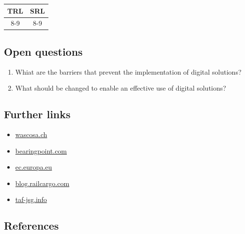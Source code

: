 \documentclass[
]{book}
\providecommand{\tightlist}{%
  \setlength{\itemsep}{0pt}\setlength{\parskip}{0pt}}
\begin{document}
\begin{longtable}[]{@{}cc@{}}
\toprule
TRL & SRL\tabularnewline
\midrule
\endhead
8-9 & 8-9\tabularnewline
\bottomrule
\end{longtable}

\hypertarget{open-questions-26}{%
\subsection*{Open questions}\label{open-questions-26}}

\begin{enumerate}
\def\labelenumi{\arabic{enumi}.}
\tightlist
\item
  Whiat are the barriers that prevent the implementation of digital solutions?
\item
  What should be changed to enable an effective use of digital solutions?
\end{enumerate}

\hypertarget{further-links-23}{%
\subsection*{Further links}\label{further-links-23}}

\begin{itemize}
\tightlist
\item
  \href{https://www.wascosa.ch/infoletter/2016/wascosa-infoletter-25-en.pdf}{wascosa.ch}
\item
  \href{https://www.bearingpoint.com/files/Digitalization_rail_infrastructure_management_PR.pdf?download=0\&itemId=659400}{bearingpoint.com}
\item
  \href{https://ec.europa.eu/transport/modes/rail/useful-links_de}{ec.europa.eu}
\item
  \href{https://blog.railcargo.com/en/artikel/einzelwagenverkehr}{blog.railcargo.com}
\item
  \href{http://taf-jsg.info/wp-content/uploads/2019/05/RU-IM-Telematics-governance-ToR_V1.3_final-14-05-2019.pdf}{taf-jsg.info}
\end{itemize}

\hypertarget{references-26}{%
\subsection*{References}\label{references-26}}
\end{document}
